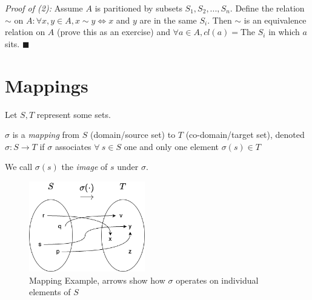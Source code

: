 \begin{theorem}
\noindent\textit{Proof of (2):} Assume $A$ is paritioned by subsets $S_1,S_2,...,S_n$. Define the relation $\sim$ on $A: \forall x,y \in A, x\sim y \iff x$ and $y$ are in the same $S_i$. Then $\sim$ is an equivalence relation on $A$ (prove this as an exercise) and $\forall a \in A, cl(a)=$The $S_i$ in which $a$ sits.
$\blacksquare$
\end{theorem}



\section{Mappings} Let $S,T$ represent some sets.\\
\begin{definition}
$\sigma$ is a \textit{mapping} from $S$ (domain/source set) to $T$ (co-domain/target set), denoted $\sigma: S \rightarrow T$ if $\sigma$ associates $\forall \ s \in S$ one and only one element $\sigma(s)\in T$
\end{definition}
\noindent We call $\sigma(s)$ the \textit{image} of $s$ under $\sigma$.\steezybreak\\ 

\begin{figure}[ht!]
    \centering
    \includegraphics[width=0.45\textwidth]{Figures/Mappings_example.png}
    \caption{Mapping Example, arrows show how $\sigma$ operates on individual elements of $S$}
    \label{fig:simple_mapping_example}
\end{figure}


